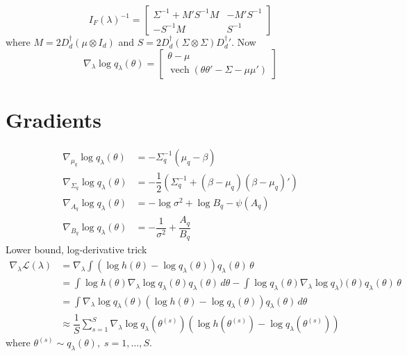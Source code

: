 \documentclass[12pt]{article}
\DeclareMathOperator{\vvvh}{vech}
\begin{document}
\begin{equation}
  I_{F}(\lambda)^{-1} = \begin{bmatrix} \Sigma^{-1}+M'S^{-1}M & -M'S^{-1}\\ -S^{-1}M & S^{-1}\end{bmatrix}
\end{equation}
where $M=2D_{d}^{\dagger}(\mu\otimes I_{d})$ and $S=2D_{d}^{\dagger}(\Sigma\otimes \Sigma){D_{d}^{\dagger}}'$. Now
\begin{equation}
  \nabla_{\lambda}\log q_{\lambda}(\theta) = \begin{bmatrix} \theta - \mu \\ \vvvh\left(\theta\theta'-\Sigma-\mu\mu'\right)\end{bmatrix}
\end{equation}
\section{Gradients}
\begin{align}
  \nabla_{\mu_{q}}\log q_{\lambda}(\theta) &= -\Sigma_{q}^{-1}\left(\mu_{q}-\beta\right)\\
  \nabla_{\Sigma_{q}}\log q_{\lambda}(\theta) &= -\dfrac{1}{2}\left(\Sigma_{q}^{-1}+\left(\beta-\mu_{q}\right)\left(\beta-\mu_{q}\right)'\right)\\
  \nabla_{A_{q}}\log q_{\lambda}(\theta) &= -\log\sigma^{2}+\log B_{q}-\psi\left(A_{q}\right)\\
  \nabla_{B_{q}} \log q_{\lambda}(\theta) &= -\dfrac{1}{\sigma^{2}}+\dfrac{A_{q}}{B_{q}}
\end{align}
Lower bound, log-derivative trick
\begin{align}
  \nabla_{\lambda}\mathcal{L}(\lambda) &= \nabla_{\lambda}\int \left(\log h(\theta)-\log q_{\lambda}(\theta)\right)q_{\lambda}(\theta)\,\theta\\
  &= \int \log h(\theta)\nabla_{\lambda}\log q_{\lambda}(\theta)q_{\lambda}(\theta)\,d\theta -\int \log q_{\lambda}(\theta) \nabla_{\lambda}\log q_{\lambda})(\theta)q_{\lambda}(\theta)\,\theta\\
  &= \int \nabla_{\lambda}\log q_{\lambda}(\theta)\left(\log h(\theta)-\log q_{\lambda}(\theta)\right)q_{\lambda}(\theta)\,d\theta\\
  &\approx \dfrac{1}{S}\sum_{s=1}^{S}\nabla_{\lambda}\log q_{\lambda}\left(\theta^{(s)}\right)\left(\log h(\theta^{(s)})-\log q_{\lambda}(\theta^{(s)})\right)
\end{align}
where $\theta^{(s)}\sim q_{\lambda}(\theta),\; s=1,\ldots,S$.
\end{document}
